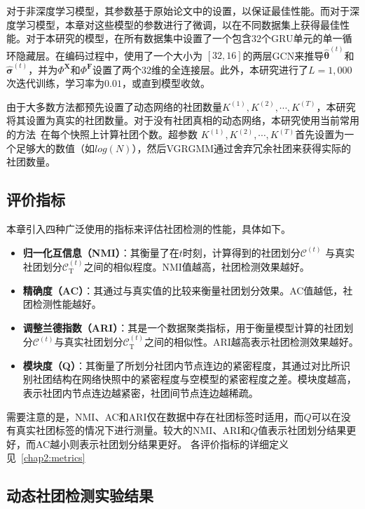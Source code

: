 对于非深度学习模型，其参数基于原始论文中的设置，以保证最佳性能。而对于深度学习模型，本章对这些模型的参数进行了微调，以在不同数据集上获得最佳性能。对于本研究的模型，在所有数据集中设置了一个包含$32$个GRU单元的单一循环隐藏层。在编码过程中，使用了一个大小为 $[32,16]$的两层GCN来推导$\hat{\bm{\theta}}^{(t)}$和$\hat{\bm{\sigma}}^{(t)}$，并为$\Phi^{\mathbf{X}}$和$\Phi^{\mathbf{F}}$设置了两个$32$维的全连接层。此外，本研究进行了$L=1,000$次迭代训练，学习率为$0.01$，或直到模型收敛。

由于大多数方法都预先设置了动态网络的社团数量$K^{(1)}, K^{(2)}, \cdots, K^{(T)}$，本研究将其设置为真实的社团数量。对于没有社团真相的动态网络，本研究使用当前常用的方法~\cite{Krzakala.2013.Zhang}在每个快照上计算社团个数。超参数 $K^{(1)},K^{(2)},\cdots,K^{(T)}$首先设置为一个足够大的数值（如$log(N)$），然后VGRGMM通过舍弃冗余社团来获得实际的社团数量。


\subsection{评价指标}
本章引入四种广泛使用的指标来评估社团检测的性能，具体如下。
\begin{itemize}
  \item \textbf{归一化互信息（NMI）}：其衡量了在$t$时刻，计算得到的社团划分$\mathcal{C}^{(t)}$ 与真实社团划分$\mathcal{C}_{\mathrm{T}}^{(t)}$之间的相似程度。NMI值越高，社团检测效果越好。
\item \textbf{精确度（AC）}：其通过与真实值的比较来衡量社团划分效果。AC值越低，社团检测性能越好。

\item \textbf{调整兰德指数（ARI）}：其是一个数据聚类指标，用于衡量模型计算的社团划分$\mathcal{C}^{(t)}$与真实社团划分$\mathcal{C}_{\mathrm{T}}^{(t)}$之间的相似性。ARI越高表示社团检测效果越好。

\item \textbf{模块度（Q）}：其衡量了所划分社团内节点连边的紧密程度，其通过对比所识别社团结构在网络快照中的紧密程度与空模型的紧密程度之差。模块度越高，表示社团内节点连边越紧密，社团间节点连边越稀疏。
\end{itemize}
需要注意的是，NMI、AC和ARI仅在数据中存在社团标签时适用，而$Q$可以在没有真实社团标签的情况下进行测量。较大的NMI、ARI和$Q$值表示社团划分结果更好，而AC越小则表示社团划分结果更好。
各评价指标的详细定义见~\ref{chap2:metrics}




\subsection{动态社团检测实验结果}



